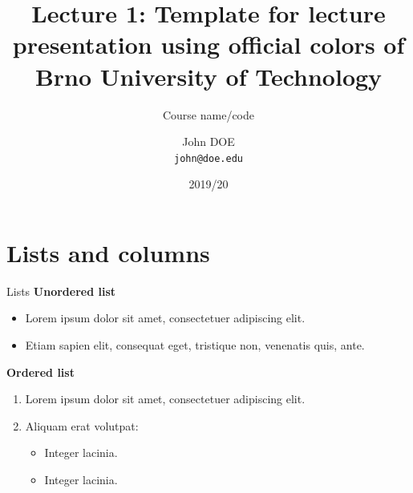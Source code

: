 \documentclass[aspectratio=1610]{beamer}
\title
{Lecture 1: Template for lecture presentation using official colors of Brno University of Technology}
\subtitle
{Course name/code}
\author
{John DOE\\
\texttt{john@doe.edu}}
\institute
{Department of Radio Electronics, Brno University of Technology, Czechia}
\date
{\small 2019/20}
\begin{document}
\begin{frame}
    \titlepage
\end{frame}


\section{Lists and columns}

\begin{frame}{Lists}
    \textbf{Unordered list}
    \begin{itemize}
        \item Lorem ipsum dolor sit amet, consectetuer adipiscing elit.

        \item Etiam sapien elit, consequat eget, tristique non, venenatis quis, ante.
    \end{itemize}
    \bigskip

    \textbf{Ordered list}
    \begin{enumerate}
        \item \alert{Lorem ipsum dolor} sit amet, consectetuer adipiscing elit.

        \item Aliquam erat volutpat:
        \begin{itemize}
            \item Integer lacinia.

            \item Integer lacinia.
        \end{itemize}
    \end{enumerate}
\end{frame}

\end{document}
